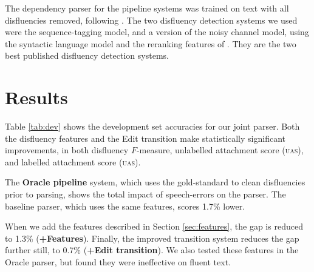 \documentclass[11pt,letterpaper]{article}
\begin{document}
The dependency parser for the pipeline systems was trained on text with all disfluencies
removed, following \citet{Charniak01a}. 
The two disfluency detection systems we used were the \citet{qian:13} sequence-tagging
model, and a version of the \citet{Johnson04a} noisy channel model, using the
\citet{Charniak01b} syntactic language model and the reranking features of
\citet{zwarts:11}. They are the two best published disfluency detection systems.




\section{Results}
\label{sec:results}

Table \ref{tab:dev} shows the development set accuracies for our joint parser.
Both the disfluency features and the 
Edit transition make statistically significant improvements, in both
disfluency $F$-measure, unlabelled attachment score (\textsc{uas}), and
labelled attachment score (\textsc{uas}).

The \textbf{Oracle pipeline} system, which uses the gold-standard to clean disfluencies
prior to parsing, shows the total impact of speech-errors on the parser.  The
baseline parser, which uses the same features, scores 1.7\% lower.

When we add the features described in Section \ref{sec:features}, the gap is reduced
to 1.3\% (\textbf{+Features}).  Finally, the improved transition system reduces
the gap further still, to 0.7\% (\textbf{+Edit transition}).  We also tested
these features in the Oracle parser, but found they were ineffective on fluent
text.
\end{document}
